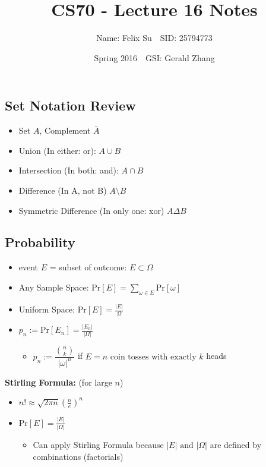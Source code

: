 \documentclass{article}\usepackage{amsmath,amssymb,amsthm,tikz,tkz-graph,color,chngpage,soul,hyperref,csquotes,graphicx,floatrow, listings}\newcommand*{\QEDB}{\hfill\ensuremath{\square}}\newtheorem*{prop}{Proposition}\renewcommand{\theenumi}{\alph{enumi}}\usepackage[shortlabels]{enumitem}\usepackage[nobreak=true]{mdframed}\usetikzlibrary{matrix,calc}\MakeOuterQuote{"}\usepackage[margin=0.75in]{geometry} \newtheorem{theorem}{Theorem}\newcommand{\Z}{\mathbb Z}\newcommand{\R}{\mathbb R}\newcommand{\Q}{\mathbb Q}\newcommand{\N}{\mathbb N}\newcommand{\x}[1]{\textrm{ #1 }}\newcommand{\pr}{\textrm{Pr}}
\title{CS70 - Lecture 16 Notes}
\author{Name: Felix Su$\quad$SID: 25794773}
\date{Spring 2016$\quad$GSI: Gerald Zhang}
\begin{document}
\maketitle

\subsection*{Set Notation Review}
\begin{itemize}
    \item Set $A$, Complement $\bar{A}$
    \item Union (In either: or): $A \cup B$
    \item Intersection (In both: and): $A \cap B$
    \item Difference (In A, not B) $A \setminus B$
    \item Symmetric Difference (In only one: xor) $A \Delta B$
\end{itemize}
\subsection*{Probability}
\begin{itemize}
    \item event $E$ = subset of outcome: $E \subset \Omega$
    \item Any Sample Space: $\pr[E]=\sum\limits_{\omega \in E}\pr[\omega]$
    \item Uniform Space: $\pr[E]=\frac{|E|}{\Omega}$
    \item $p_n := \pr[E_n]=\frac{|E_n|}{|\Omega|}$
    \begin{itemize}
        \item $p_n := \dfrac{\binom{n}{k}}{|\omega|^{n}}$ if $E = n \x{coin tosses with exactly} k$ heads 
    \end{itemize}
\end{itemize}
\begin{mdframed}
\textbf{Stirling Formula:} (for large $n$)
\begin{itemize}
    \item $n! \approx \sqrt{2\pi n}(\frac{n}{e})^n$
    \item $\pr[E]=\frac{|E|}{|\Omega|}$
    \begin{itemize}
        \item Can apply Stirling Formula because $|E| \x{and} |\Omega|$ are defined by combinations (factorials)
    \end{itemize}
\end{itemize}
\end{mdframed}
\end{document}
